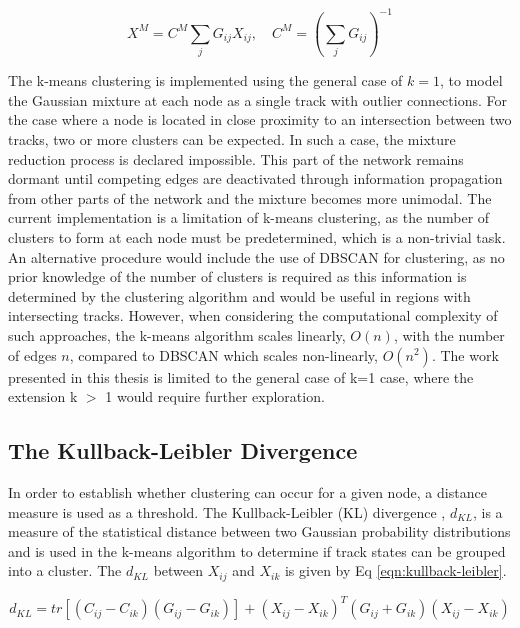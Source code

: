 \begin{equation}
    X^{M} = C^{M} \sum_{j} G_{ij} X_{ij},  \quad  C^{M} = \left( \sum_{j} G_{ij} \right) ^{-1}
    \label{eqn:inverse-variance-weighting}
\end{equation}

The k-means clustering is implemented using the general case of $k=1$, to model the Gaussian mixture at each node as a single track with outlier connections. For the case where a node is located in close proximity to an intersection between two tracks, two or more clusters can be expected. In such a case, the mixture reduction process is declared impossible. This part of the network remains dormant until competing edges are deactivated through information propagation from other parts of the network and the mixture becomes more unimodal. The current implementation is a limitation of k-means clustering, as the number of clusters to form at each node must be predetermined, which is a non-trivial task. An alternative procedure would include the use of DBSCAN for clustering, as no prior knowledge of the number of clusters is required as this information is determined by the clustering algorithm and would be useful in regions with intersecting tracks. However, when considering the computational complexity of such approaches, the k-means algorithm scales linearly, $O(n)$, with the number of edges $n$, compared to DBSCAN which scales non-linearly, $O(n^2)$. The work presented in this thesis is limited to the general case of k=1 case, where the extension k $>$ 1 would require further exploration. 


\subsection{The Kullback-Leibler Divergence}
In order to establish whether clustering can occur for a given node, a distance measure is used as a threshold. The Kullback-Leibler (KL) divergence \cite{KL, FRUHWIRTH19971}, $d_{KL}$, is a measure of the statistical distance between two Gaussian probability distributions and is used in the k-means algorithm to determine if track states can be grouped into a cluster. The $d_{KL}$ between $X_{ij}$ and $X_{ik}$ is given by Eq \eqref{eqn:kullback-leibler}.

\begin{equation}
    d_{KL} = tr[(C_{ij} - C_{ik})(G_{ij} - G_{ik})] + (X_{ij} - X_{ik})^{T}(G_{ij} + G_{ik})(X_{ij} - X_{ik})
    \label{eqn:kullback-leibler}
\end{equation}

